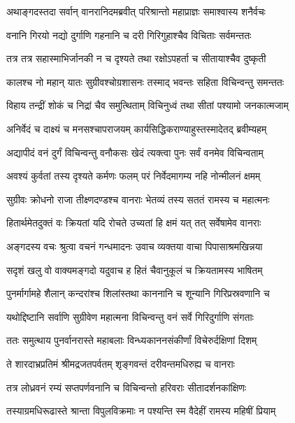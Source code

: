 
\twolineshloka
{अथाङ्गदस्तदा सर्वान् वानरानिदमब्रवीत्}
{परिश्रान्तो महाप्राज्ञः समाश्वास्य शनैर्वचः} %

\twolineshloka
{वनानि गिरयो नद्यो दुर्गाणि गहनानि च}
{दरी गिरिगुहाश्चैव विचिताः सर्वमन्ततः} %

\twolineshloka
{तत्र तत्र सहास्माभिर्जानकी न च दृश्यते}
{तथा रक्षोऽपहर्ता च सीतायाश्चैव दुष्कृती} %

\twolineshloka
{कालश्च नो महान् यातः सुग्रीवश्चोग्रशासनः}
{तस्माद् भवन्तः सहिता विचिन्वन्तु समन्ततः} %

\twolineshloka
{विहाय तन्द्रीं शोकं च निद्रां चैव समुत्थिताम्}
{विचिनुध्वं तथा सीतां पश्यामो जनकात्मजाम्} %

\twolineshloka
{अनिर्वेदं च दाक्ष्यं च मनसश्चापराजयम्}
{कार्यसिद्धिकराण्याहुस्तस्मादेतद् ब्रवीम्यहम्} %

\twolineshloka
{अद्यापीदं वनं दुर्गं विचिन्वन्तु वनौकसः}
{खेदं त्यक्त्वा पुनः सर्वं वनमेव विचिन्वताम्} %

\twolineshloka
{अवश्यं कुर्वतां तस्य दृश्यते कर्मणः फलम्}
{परं निर्वेदमागम्य नहि नोन्मीलनं क्षमम्} %

\twolineshloka
{सुग्रीवः क्रोधनो राजा तीक्ष्णदण्डश्च वानराः}
{भेतव्यं तस्य सततं रामस्य च महात्मनः} %

\twolineshloka
{हितार्थमेतदुक्तं वः क्रियतां यदि रोचते}
{उच्यतां हि क्षमं यत् तत् सर्वेषामेव वानराः} %

\twolineshloka
{अङ्गदस्य वचः श्रुत्वा वचनं गन्धमादनः}
{उवाच व्यक्तया वाचा पिपासाश्रमखिन्नया} %

\twolineshloka
{सदृशं खलु वो वाक्यमङ्गदो यदुवाच ह}
{हितं चैवानुकूलं च क्रियतामस्य भाषितम्} %

\twolineshloka
{पुनर्मार्गामहे शैलान् कन्दरांश्च शिलांस्तथा}
{काननानि च शून्यानि गिरिप्रस्रवणानि च} %

\twolineshloka
{यथोद्दिष्टानि सर्वाणि सुग्रीवेण महात्मना}
{विचिन्वन्तु वनं सर्वे गिरिदुर्गाणि संगताः} %

\twolineshloka
{ततः समुत्थाय पुनर्वानरास्ते महाबलाः}
{विन्ध्यकाननसंकीर्णां विचेरुर्दक्षिणां दिशम्} %

\twolineshloka
{ते शारदाभ्रप्रतिमं श्रीमद्रजतपर्वतम्}
{शृङ्गवन्तं दरीवन्तमधिरुह्य च वानराः} %

\twolineshloka
{तत्र लोध्रवनं रम्यं सप्तपर्णवनानि च}
{विचिन्वन्तो हरिवराः सीतादर्शनकांक्षिणः} %

\twolineshloka
{तस्याग्रमधिरूढास्ते श्रान्ता विपुलविक्रमाः}
{न पश्यन्ति स्म वैदेहीं रामस्य महिषीं प्रियाम्} %

